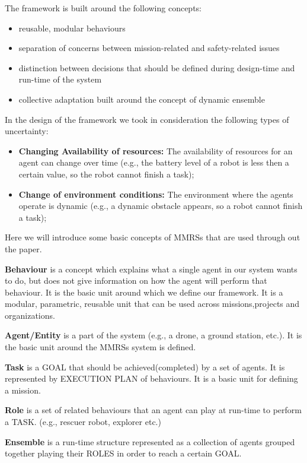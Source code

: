 \documentclass[journal]{IEEEtran}
\theoremstyle{definition}
\newcommand\darko[1]{\nb{Darko}{#1}}
\begin{document}
The framework is built around the following concepts:
\begin{itemize}
\item reusable, modular behaviours 
\item separation of concerns between mission-related and safety-related issues
\item distinction between decisions that should be defined during design-time and run-time of the system
\item collective adaptation built around the concept of dynamic ensemble
\darko{maybe there are more stuff}
\end{itemize}

In the design of the framework we took in consideration the following types of uncertainty:
\begin{itemize}
\item \textbf{Changing Availability of resources:} The availability of resources for an agent can change over time (e.g., the battery level of a robot is less then a certain value, so the robot cannot finish a task);
\item \textbf{Change of environment conditions:} The environment where the agents operate is dynamic (e.g., a dynamic obstacle appears, so a robot cannot finish a task);
\end{itemize}



Here we will introduce some basic concepts of MMRSs that are used through out the paper.

\textbf{Behaviour} is  a  concept  which  explains  what  a  single agent in our system wants to do, but does not give information on how the agent will perform that behaviour. It is the basic unit around which we define our framework. It is a modular, parametric, reusable unit that can be used across missions,projects and organizations. 

\textbf{Agent/Entity} is a part of the system (e.g., a drone, a ground station, etc.). It is the basic unit around the MMRSs system is defined.

\textbf{Task} is a GOAL that should be achieved(completed) by a set of agents. It is represented by EXECUTION PLAN of behaviours. It is a basic unit for defining a mission.

\textbf{Role} is a set of related behaviours that an agent can play at run-time to perform a TASK. (e.g., rescuer robot, explorer etc.)

\textbf{Ensemble} is a run-time structure represented as a collection of agents grouped together playing their ROLES in order to reach a certain GOAL. 
\end{document}
